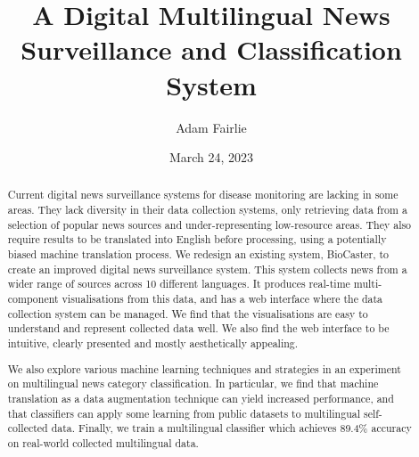 \documentclass{l4proj}
\begin{document}
\title{A Digital Multilingual News Surveillance and Classification System}
\author{Adam Fairlie}
\date{March 24, 2023}

\maketitle

\begin{abstract}
    Current digital news surveillance systems for disease monitoring are lacking in some areas. They lack diversity in their data collection systems, only retrieving data from a selection of popular news sources and under-representing low-resource areas. They also require results to be translated into English before processing, using a potentially biased machine translation process. We redesign an existing system, BioCaster, to create an improved digital news surveillance system. This system collects news from a wider range of sources across 10 different languages. It produces real-time multi-component visualisations from this data, and has a web interface where the data collection system can be managed. We find that the visualisations are easy to understand and represent collected data well. We also find the web interface to be intuitive, clearly presented and mostly aesthetically appealing. \par We also explore various machine learning techniques and strategies in an experiment on multilingual news category classification. In particular, we find that machine translation as a data augmentation technique can yield increased performance, and that classifiers can apply some learning from public datasets to multilingual self-collected data. Finally, we train a multilingual classifier which achieves 89.4\% accuracy on real-world collected multilingual data.
\end{abstract}


%
%
\def\consentname {Adam Fairlie} %
\def\consentdate {24 March 2023} %
%
\educationalconsent
\end{document}
